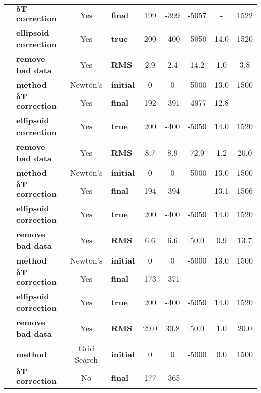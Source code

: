 \begin{table}
{\begin{tabular}{c || l c | l c c c c c}
\multirow{4}{*}{} & $\mathbf{\delta T}$ \textbf{correction} & Yes & \textbf{final}& 199 & -399 & -5057 & - & 1522 \\ 
\multirow{4}{*}{} & \textbf{ellipsoid correction} & Yes & \textbf{true}& 200 & -400 & -5050 & 14.0 & 1520 \\ 
\multirow{4}{*}{} & \textbf{remove bad data} & Yes & \textbf{RMS} & 2.9 & 2.4 & 14.2 & 1.0 & 3.8 \\ 
\hline
\multirow{4}{*}{\textbf{X, Y, Z, $\mathbf{\tau}$}} & \textbf{method} & Newton's & \textbf{initial} & 0 & 0 & -5000 & 13.0 & 1500 \\ 
\multirow{4}{*}{} & $\mathbf{\delta T}$ \textbf{correction} & Yes & \textbf{final}& 192 & -391 & -4977 & 12.8 & - \\ 
\multirow{4}{*}{} & \textbf{ellipsoid correction} & Yes & \textbf{true}& 200 & -400 & -5050 & 14.0 & 1520 \\ 
\multirow{4}{*}{} & \textbf{remove bad data} & Yes & \textbf{RMS} & 8.7 & 8.9 & 72.9 & 1.2 & 20.0 \\ 
\hline
\multirow{4}{*}{\textbf{X, Y, $\mathbf{\tau}$, $\mathbf{V_p}$}} & \textbf{method} & Newton's & \textbf{initial} & 0 & 0 & -5000 & 13.0 & 1500 \\ 
\multirow{4}{*}{} & $\mathbf{\delta T}$ \textbf{correction} & Yes & \textbf{final}& 194 & -394 & - & 13.1 & 1506 \\ 
\multirow{4}{*}{} & \textbf{ellipsoid correction} & Yes & \textbf{true}& 200 & -400 & -5050 & 14.0 & 1520 \\ 
\multirow{4}{*}{} & \textbf{remove bad data} & Yes & \textbf{RMS} & 6.6 & 6.6 & 50.0 & 0.9 & 13.7 \\ 
\hline
\multirow{4}{*}{\textbf{X, Y}} & \textbf{method} & Newton's & \textbf{initial} & 0 & 0 & -5000 & 13.0 & 1500 \\ 
\multirow{4}{*}{} & $\mathbf{\delta T}$ \textbf{correction} & Yes & \textbf{final}& 173 & -371 & - & - & - \\ 
\multirow{4}{*}{} & \textbf{ellipsoid correction} & Yes & \textbf{true}& 200 & -400 & -5050 & 14.0 & 1520 \\ 
\multirow{4}{*}{} & \textbf{remove bad data} & Yes & \textbf{RMS} & 29.0 & 30.8 & 50.0 & 1.0 & 20.0 \\ 
\hline
\multirow{4}{*}{\textbf{SIOgs}} & \textbf{method} & Grid Search & \textbf{initial} & 0 & 0 & -5000 & 0.0 & 1500 \\ 
\multirow{4}{*}{} & $\mathbf{\delta T}$ \textbf{correction} & No & \textbf{final}& 177 & -365 & - & - & - \\ 

\end{tabular}}
\end{table}
